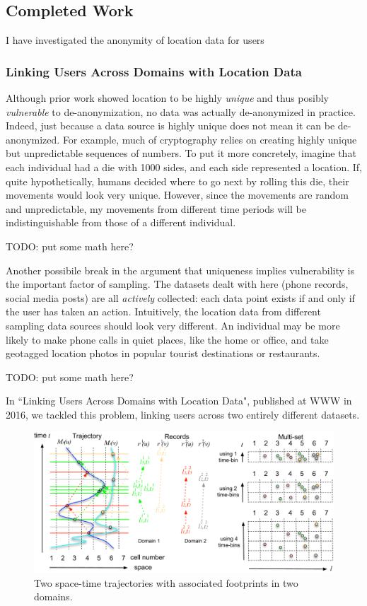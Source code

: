 \subsection{Completed Work}
I have investigated the anonymity of location data for users

\subsubsection{Linking Users Across Domains with Location Data}
Although prior work showed location to be highly \emph{unique} and thus posibly \emph{vulnerable} to de-anonymization, no data was actually de-anonymized in practice.
Indeed, just because a data source is highly unique does not mean it can be de-anonymized.
For example, much of cryptography relies on creating highly unique but unpredictable sequences of numbers.
To put it more concretely, imagine that each individual had a die with 1000 sides, and each side represented a location.
If, quite hypothetically, humans decided where to go next by rolling this die, their movements would look very unique.
However, since the movements are random and unpredictable, my movements from different time periods will be indistinguishable from those of a different individual.

TODO: put some math here?

Another possibile break in the argument that uniqueness implies vulnerability is the important factor of sampling.
The datasets dealt with here (phone records, social media posts) are all \emph{actively} collected: each data point exists if and only if the user has taken an action.
Intuitively, the location data from different sampling data sources should look very different.
An individual may be more likely to make phone calls in quiet places, like the home or office, and take geotagged location photos in popular tourist destinations or restaurants.

TODO: put some math here?

In ``Linking Users Across Domains with Location Data", published at WWW in 2016, we tackled this problem, linking users across two entirely different datasets.

\begin{figure}[t]
  \begin{center}
    \includegraphics[width=0.65\linewidth]{fig/linking_explain.pdf}
  \end{center}
  \caption{Two space-time trajectories with associated footprints in two domains.}
  \label{fig:linking_explain}
\end{figure}

